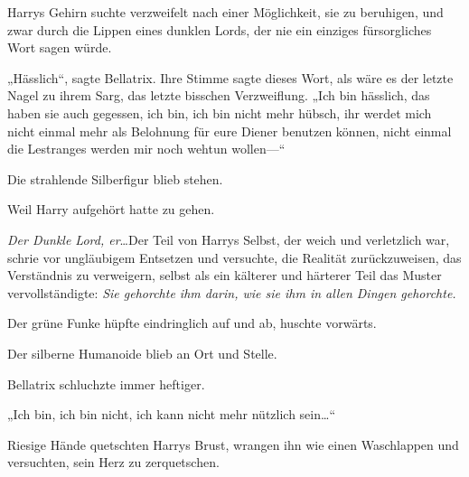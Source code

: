 Harrys Gehirn suchte verzweifelt nach einer Möglichkeit, sie zu beruhigen, und zwar durch die Lippen eines dunklen Lords, der nie ein einziges fürsorgliches Wort sagen würde.

„Hässlich“, sagte Bellatrix. Ihre Stimme sagte dieses Wort, als wäre es der letzte Nagel zu ihrem Sarg, das letzte bisschen Verzweiflung. „Ich bin hässlich, das haben sie auch gegessen, ich bin, ich bin nicht mehr hübsch, ihr werdet mich nicht einmal mehr als Belohnung für eure Diener benutzen können, nicht einmal die Lestranges werden mir noch wehtun wollen—“

Die strahlende Silberfigur blieb stehen.

Weil Harry aufgehört hatte zu gehen.

\emph{Der Dunkle Lord, er}…Der Teil von Harrys Selbst, der weich und verletzlich war, schrie vor ungläubigem Entsetzen und versuchte, die Realität zurückzuweisen, das Verständnis zu verweigern, selbst als ein kälterer und härterer Teil das Muster vervollständigte: \emph{Sie gehorchte ihm darin, wie sie ihm in allen Dingen gehorchte.}

Der grüne Funke hüpfte eindringlich auf und ab, huschte vorwärts.

Der silberne Humanoide blieb an Ort und Stelle.

Bellatrix schluchzte immer heftiger.

„Ich bin, ich bin nicht, ich kann nicht mehr nützlich sein…“

Riesige Hände quetschten Harrys Brust, wrangen ihn wie einen Waschlappen und versuchten, sein Herz zu zerquetschen.

